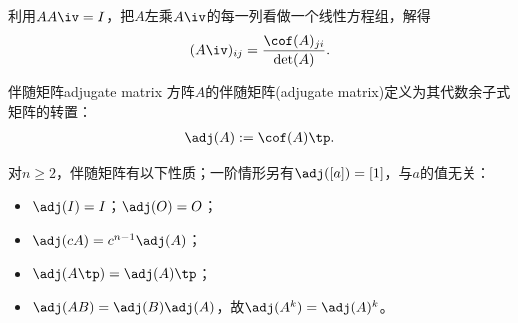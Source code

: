 \begin{corollary}
	利用$AA\iv=I$，把$A$左乘$A\iv$的每一列看做一个线性方程组，解得
	\[
		(A\iv)_{ij}=\frac{\cof(A)_{ji}}{\det(A)}.
	\]
\end{corollary}
\begin{definition}{伴随矩阵}{adjugate matrix}
	方阵$A$的伴随矩阵(adjugate matrix)定义为其代数余子式矩阵的转置：
	\begin{align}
		\adj(A):=\cof(A)\tp.
	\end{align}
\end{definition}

\begin{corollary}
	对$n\geq2$，伴随矩阵有以下性质；一阶情形另有$\adj([a])=[1]$，与$a$的值无关：
	\begin{itemize}
		\item $\adj(I)=I$；$\adj(O)=O$；
		\item $\adj(cA)=c^{n-1}\adj(A)$；
		\item $\adj(A\tp)=\adj(A)\tp$；
		\item $\adj(AB)=\adj(B)\adj(A)$，故$\adj(A^k)=\adj(A)^k$。
	\end{itemize}
\end{corollary}

